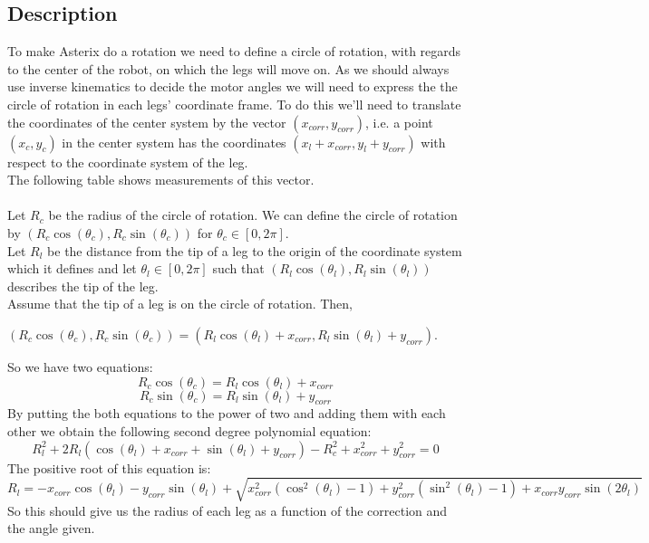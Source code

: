 \documentclass[11pt, a4paper]{article}
\newcommand{\coord}[2]{\left(#1,#2\right)}
\begin{document}
\subsection{Description}
To make Asterix do a rotation we need to define a circle of rotation, with regards to the center of the robot, on which the legs will move on.
As we should always use inverse kinematics to decide the motor angles we will need to express the the circle of rotation in each legs' coordinate frame. To do this we'll need to translate the coordinates of the center system by the vector $(x_{corr}, y_{corr})$, i.e. a point $\left(x_c,y_c\right)$ in the center system has the coordinates $\left(x_l + x_{corr},y_l+y_{corr}\right)$ with respect to the coordinate system of the leg.\\ 
The following table shows measurements of this vector. \\
\vspace{0.5cm}
\\
Let $R_c$ be the radius of the circle of rotation. We can define the circle of rotation by $\left(R_c \cos(\theta_c), R_c \sin(\theta_c)\right)$ for $\theta_c \in \left[0,2\pi\right]$.\\
Let $R_l$ be the distance from the tip of a leg to the origin of the coordinate system which it defines and let $\theta_l \in \left[0,2\pi\right]$ such that $\left(R_l \cos(\theta_l), R_l \sin(\theta_l)\right)$ describes the tip of the leg.\\
Assume that the tip of a leg is on the circle of rotation. Then, \\
\begin{center}
$\coord{R_c\cos(\theta_c)}{R_c\sin(\theta_c)} = \coord{R_l\cos(\theta_l)+x_{corr}}{R_l\sin(\theta_l)+y_{corr}}$.
\end{center}
So we have two equations:
\begin{equation}
R_c\cos(\theta_c) = R_l\cos(\theta_l)+x_{corr}
\end{equation}
\begin{equation}
R_c\sin(\theta_c) = R_l\sin(\theta_l)+y_{corr}
\end{equation}
By putting the both equations to the power of two and adding them with each other we obtain the following second degree polynomial equation:
\begin{equation*}
R_l^2 + 2R_l\left(\cos(\theta_l)+x_{corr}+\sin(\theta_l)+y_{corr}\right) - R_c^2 + x_{corr}^2 + y_{corr}^2 = 0
\end{equation*}
The positive root of this equation is:
\begin{equation*}
R_l = -x_{corr}\cos(\theta_l)-y_{corr}\sin(\theta_l)+\sqrt{x_{corr}^2\left(\cos^2(\theta_l)-1\right) + y_{corr}^2\left(\sin^2(\theta_l)-1\right)+x_{corr}y_{corr}\sin(2\theta_l)}
\end{equation*} 
So this should give us the radius of each leg as a function of the correction and the angle given.
\clearpage
\end{document}
